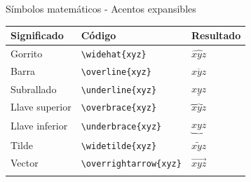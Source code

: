 \documentclass[
  ignorenonframetext,
]{beamer}
\begin{document}
\begin{frame}[fragile]{Símbolos matemáticos - Acentos expansibles}
\label{suxedmbolos-matemuxe1ticos---acentos-expansibles}
\begin{longtable}[]{@{}lll@{}}
\toprule\noalign{}
Significado & Código & Resultado \\
\midrule\noalign{}
\endhead
Gorrito & \texttt{\textbackslash{}widehat\{xyz\}} & \(\widehat{xyz}\) \\
Barra & \texttt{\textbackslash{}overline\{xyz\}} & \(\overline{xyz}\) \\
Subrallado & \texttt{\textbackslash{}underline\{xyz\}} &
\(\underline{xyz}\) \\
Llave superior & \texttt{\textbackslash{}overbrace\{xyz\}} &
\(\overbrace{xyz}\) \\
Llave inferior & \texttt{\textbackslash{}underbrace\{xyz\}} &
\(\underbrace{xyz}\) \\
Tilde & \texttt{\textbackslash{}widetilde\{xyz\}} &
\(\widetilde{xyz}\) \\
Vector & \texttt{\textbackslash{}overrightarrow\{xyz\}} &
\(\overrightarrow{xyz}\) \\
\bottomrule\noalign{}
\end{longtable}
\end{frame}
\end{document}
